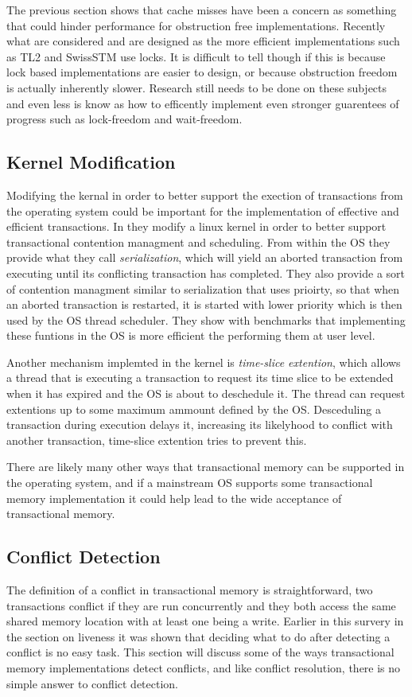 The previous section shows that cache misses have been a concern as something that could hinder performance for obstruction free implementations.
Recently what are considered and are designed as the more efficient implementations such as TL2 \cite{Dice06transactionallocking} and SwissSTM \cite{1542494} use locks.
It is difficult to tell though if this is because lock based implementations are easier to design, or because obstruction freedom is actually inherently slower.
Research still needs to be done on these subjects and even less is know as how to efficently implement even stronger guarentees of progress such as lock-freedom and wait-freedom.

\subsection{Kernel Modification}
Modifying the kernal in order to better support the exection of transactions from the operating system could be important for the implementation of effective and efficient transactions.
In \cite{1693465} they modify a linux kernel in order to better support transactional contention managment and scheduling.
From within the OS they provide what they call \emph{serialization}, which will yield an aborted transaction from executing until its conflicting transaction has completed.
They also provide a sort of contention managment similar to serialization that uses prioirty, so that when an aborted transaction is restarted, it is started with lower priority which is then used by the OS thread scheduler.
They show with benchmarks that implementing these funtions in the OS is more efficient the performing them at user level.

Another mechanism implemted in the kernel is \emph{time-slice extention}, which allows a thread that is executing a transaction to request its time slice to be extended when it has expired and the OS is about to deschedule it.
The thread can request extentions up to some maximum ammount defined by the OS.
Desceduling a transaction during execution delays it, increasing its likelyhood to conflict with another transaction, time-slice extention tries to prevent this.

There are likely many other ways that transactional memory can be supported in the operating system, and if a mainstream OS supports some transactional memory implementation it could help lead to the wide acceptance of transactional memory.

\subsection{Conflict Detection}
The definition of a conflict in transactional memory is straightforward, two transactions conflict if they are run concurrently and they both access the same shared memory location with at least one being a write.
Earlier in this survery in the section on liveness it was shown that deciding what to do after detecting a conflict is no easy task.
This section will discuss some of the ways transactional memory implementations detect conflicts, and like conflict resolution, there is no simple answer to conflict detection.



